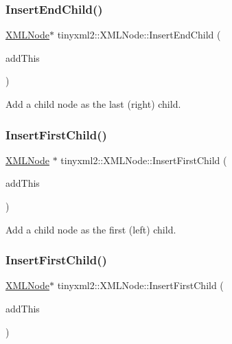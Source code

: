 \subsubsection{\texorpdfstring{Insert\+End\+Child()}{InsertEndChild()}\hspace{0.1cm}{\footnotesize\ttfamily [2/2]}}
{\footnotesize\ttfamily \hyperlink{classtinyxml2_1_1XMLNode}{X\+M\+L\+Node}$\ast$ tinyxml2\+::\+X\+M\+L\+Node\+::\+Insert\+End\+Child (\begin{DoxyParamCaption}\item[{\hyperlink{classtinyxml2_1_1XMLNode}{X\+M\+L\+Node} $\ast$}]{add\+This }\end{DoxyParamCaption})}

Add a child node as the last (right) child. \mbox{\label{classtinyxml2_1_1XMLNode_ac609a8f3ea949027f439280c640bbaf2}} 
\subsubsection{\texorpdfstring{Insert\+First\+Child()}{InsertFirstChild()}\hspace{0.1cm}{\footnotesize\ttfamily [1/2]}}
{\footnotesize\ttfamily \hyperlink{classtinyxml2_1_1XMLNode}{X\+M\+L\+Node} $\ast$ tinyxml2\+::\+X\+M\+L\+Node\+::\+Insert\+First\+Child (\begin{DoxyParamCaption}\item[{\hyperlink{classtinyxml2_1_1XMLNode}{X\+M\+L\+Node} $\ast$}]{add\+This }\end{DoxyParamCaption})}

Add a child node as the first (left) child. \mbox{\label{classtinyxml2_1_1XMLNode_a8ff7dc071f3a1a6ae2ac25a37492865d}} 
\subsubsection{\texorpdfstring{Insert\+First\+Child()}{InsertFirstChild()}\hspace{0.1cm}{\footnotesize\ttfamily [2/2]}}
{\footnotesize\ttfamily \hyperlink{classtinyxml2_1_1XMLNode}{X\+M\+L\+Node}$\ast$ tinyxml2\+::\+X\+M\+L\+Node\+::\+Insert\+First\+Child (\begin{DoxyParamCaption}\item[{\hyperlink{classtinyxml2_1_1XMLNode}{X\+M\+L\+Node} $\ast$}]{add\+This }\end{DoxyParamCaption})}

